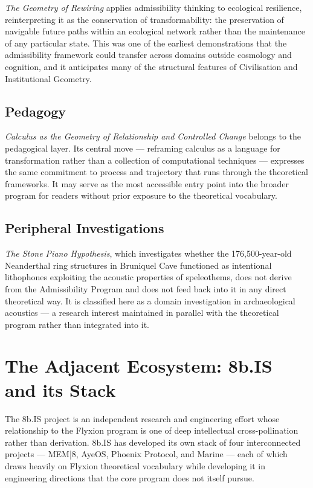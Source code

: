 \documentclass[12pt, twoside]{article}
\begin{document}
\emph{The Geometry of Rewiring} applies admissibility thinking to ecological
resilience, reinterpreting it as the conservation of transformability: the
preservation of navigable future paths within an ecological network rather
than the maintenance of any particular state. This was one of the earliest
demonstrations that the admissibility framework could transfer across domains
outside cosmology and cognition, and it anticipates many of the structural
features of Civilisation and Institutional Geometry.

\subsection{Pedagogy}

\emph{Calculus as the Geometry of Relationship and Controlled Change} belongs
to the pedagogical layer. Its central move — reframing calculus as a language
for transformation rather than a collection of computational techniques —
expresses the same commitment to process and trajectory that runs through the
theoretical frameworks. It may serve as the most accessible entry point into
the broader program for readers without prior exposure to the theoretical
vocabulary.

\subsection{Peripheral Investigations}

\emph{The Stone Piano Hypothesis}, which investigates whether the
176,500-year-old Neanderthal ring structures in Bruniquel Cave functioned as
intentional lithophones exploiting the acoustic properties of speleothems,
does not derive from the Admissibility Program and does not feed back into
it in any direct theoretical way. It is classified here as a domain
investigation in archaeological acoustics — a research interest maintained
in parallel with the theoretical program rather than integrated into it.

\section{The Adjacent Ecosystem: 8b.IS and its Stack}

The 8b.IS project is an independent research and engineering effort whose
relationship to the Flyxion program is one of deep intellectual
cross-pollination rather than derivation. 8b.IS has developed its own stack
of four interconnected projects — MEM|8, AyeOS, Phoenix Protocol, and Marine
— each of which draws heavily on Flyxion theoretical vocabulary while
developing it in engineering directions that the core program does not itself
pursue.
\end{document}
